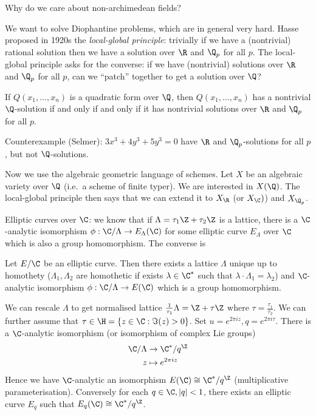 \documentclass[a4paper]{article}
\begin{document}
Why do we care about non-archimedean fields?

We want to solve Diophantine problems, which are in general very hard. Hasse proposed in 1920s the \emph{local-global principle}: trivially if we have a (nontrivial) rational solution then we have a solution over \(\R\) and \(\Q_p\) for all \(p\). The local-global principle asks for the converse: if we have (nontrivial) solutions over \(\R\) and \(\Q_p\) for all \(p\), can we ``patch'' together to get a solution over \(\Q\)?

\begin{theorem}
  If \(Q(x_1, \dots, x_n)\) is a quadratic form over \(\Q\), then \(Q(x_1, \dots, x_n)\) has a nontrivial \(\Q\)-solution if and only if and only if it has nontrivial solutions over \(\R\) and \(\Q_p\) for all \(p\).
\end{theorem}

Counterexample (Selmer): \(3x^3 + 4y^3 + 5y^3 = 0\) have \(\R\) and \(\Q_p\)-solutions for all \(p\), but not \(\Q\)-solutions.

Now we use the algebraic geometric language of schemes. Let \(X\) be an algebraic variety over \(\Q\) (i.e.\ a scheme of finite typer). We are interested in \(X(\Q)\). The local-global principle then says that we can extend it to \(X_\R\) (or \(X_\C)\)) and \(X_{\Q_p}\).

Elliptic curves over \(\C\): we know that if \(\Lambda = \tau_1 \Z + \tau_2 \Z\) is a lattice, there is a \(\C\)-analytic isomorphism \(\phi: \C/\Lambda \to E_\Lambda(\C)\) for some elliptic curve \(E_\Lambda\) over \(\C\) which is also a group homomorphism. The converse is

\begin{theorem}
  Let \(E/\C\) be an elliptic curve. Then there exists a lattice \(\Lambda\) unique up to homothety (\(\Lambda_1, \Lambda_2\) are homothetic if exists \(\lambda \in \C^*\) such that \(\lambda \cdot \Lambda_1 = \lambda_2\)) and \(\C\)-analytic isomorphism \(\phi: \C/\Lambda \to E(\C)\) which is a group homomorphism.
\end{theorem}

We can rescale \(\Lambda\) to get normalised lattice \(\frac{1}{\tau_1}\Lambda = \Z + \tau \Z\) where \(\tau = \frac{\tau_1}{\tau_2}\). We can further assume that \(\tau \in \H = \{z \in \C: \Im(z) > 0\}\). Set \(u = e^{2\pi i z}, q = e^{2\pi i \tau}\). There is a \(\C\)-analytic isomorphism (or isomorphism of complex Lie groups)
\begin{align*}
  \C/\Lambda &\to \C^*/q^\Z \\
  z &\mapsto e^{2\pi i z}
\end{align*}
Hence we have \(\C\)-analytic an isomorphism \(E(\C) \cong \C^*/q^\Z\) (multiplicative parameterisation). Conversely for each \(q \in \C, |q| < 1\), there exists an elliptic curve \(E_q\) such that \(E_q(\C) \cong \C^*/q^\Z\).
\end{document}
